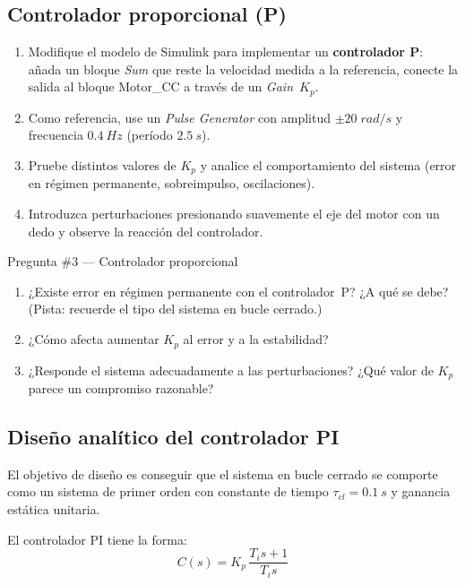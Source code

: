 \documentclass[12pt,a4paper]{article}
\begin{document}
\subsection{Controlador proporcional (P)}

\begin{enumerate}
  \item Modifique el modelo de Simulink para implementar un \textbf{controlador P}:
        añada un bloque \emph{Sum} que reste la velocidad medida a la referencia,
        conecte la salida al bloque Motor\_CC a través de un \emph{Gain}~$K_p$.
  \item Como referencia, use un \emph{Pulse Generator} con amplitud $\pm 20\;\si{rad/s}$
        y frecuencia $\SI{0.4}{Hz}$ (período $\SI{2.5}{s}$).
  \item Pruebe distintos valores de $K_p$ y analice el comportamiento del sistema
        (error en régimen permanente, sobreimpulso, oscilaciones).
  \item Introduzca perturbaciones presionando suavemente el eje del motor con
        un dedo y observe la reacción del controlador.
\end{enumerate}

\begin{pregunta}{Pregunta \#3 — Controlador proporcional}
  \begin{enumerate}[label=\alph*)]
    \item ¿Existe error en régimen permanente con el controlador~P?
          ¿A qué se debe? (Pista: recuerde el tipo del sistema en bucle cerrado.)
    \item ¿Cómo afecta aumentar $K_p$ al error y a la estabilidad?
    \item ¿Responde el sistema adecuadamente a las perturbaciones?
          ¿Qué valor de $K_p$ parece un compromiso razonable?
  \end{enumerate}
\end{pregunta}

\subsection{Diseño analítico del controlador PI}

El objetivo de diseño es conseguir que el sistema en bucle cerrado se comporte como
un sistema de primer orden con constante de tiempo $\tau_{cl}=\SI{0.1}{s}$ y ganancia
estática unitaria.

El controlador PI tiene la forma:
\begin{equation}
  C(s) = K_p\,\frac{T_i s + 1}{T_i s}
  \label{eq:PI}
\end{equation}
\end{document}
